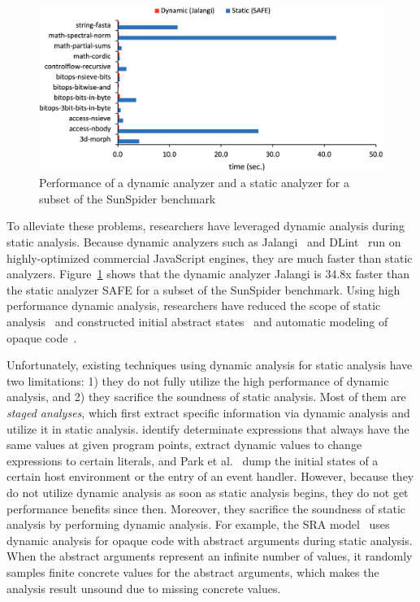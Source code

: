 \begin{figure}[t]
  \centering
  \includegraphics[width=\linewidth]{img/performance_v8v7}
  \vspace*{-2em}
  \caption{Performance of a dynamic analyzer and a static analyzer for a subset
  of the SunSpider benchmark}
  \label{fig:performance}
  \vspace*{-1em}
\end{figure}

To alleviate these problems, researchers have leveraged
dynamic analysis during static analysis.  Because dynamic
analyzers such as Jalangi~\cite{jalangi} and DLint~\cite{dlint} run on
highly-optimized commercial JavaScript engines, they are much faster than
static analyzers.  Figure~\ref{fig:performance} shows that the dynamic analyzer
Jalangi is 34.8x faster than the static analyzer SAFE for a subset of the
SunSpider benchmark.  Using high performance dynamic analysis, researchers have
reduced the scope of static analysis~\cite{determinacy, blendedJS} and constructed
initial abstract states~\cite{battles, eha} and automatic modeling of opaque
code~\cite{sra}.

Unfortunately, existing techniques using dynamic analysis for static analysis
have two limitations: 1) they do not fully utilize the high performance of dynamic
analysis, and 2) they sacrifice the soundness of static analysis.  Most of
them are \textit{staged analyses}, which first extract specific
information via dynamic analysis and utilize it in static analysis.
\citet{determinacy} identify determinate expressions that always have the same
values at given program points, \citet{blendedJS} extract dynamic values to
change expressions to certain literals, and Park et al.~\cite{battles,eha} dump
the initial states of a certain host environment or the entry of an event handler.
However, because they do not utilize dynamic analysis as soon as static
analysis begins, they do not get performance benefits since then.  Moreover,
they sacrifice the soundness of static analysis by performing dynamic analysis.
For example, the SRA model~\cite{sra} uses dynamic analysis for opaque code
with abstract arguments during static analysis.  When the abstract arguments
represent an infinite number of values, it randomly samples finite
concrete values for the abstract arguments, which makes the analysis
result unsound due to missing concrete values.

